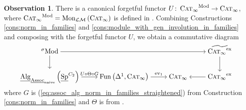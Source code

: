 \documentclass{article}
\DeclareMathOperator{\Alg}{Alg}
\DeclareMathOperator{\Cat}{Cat} %
\DeclareMathOperator{\CAT}{C\normalfont\textsc{at}_\infty} %
\DeclareMathOperator{\Catex}{\Cat_\infty^{ex}} %
\DeclareMathOperator{\Fun}{Fun} %
\DeclareMathOperator{\Mod}{Mod} %
\DeclareMathOperator{\Modh}{{}^{\sigma}Mod} %
\DeclareMathOperator{\Spectra}{Sp} %
\newcommand{\ev}{\mathrm{ev}}
\theoremstyle{definition}
\newtheorem{observation}[equation]{Observation}
\begin{document}
\begin{observation}   
    There is a canonical forgetful functor $ U \colon \CAT^{\Mod} \to \CAT $, where $ \CAT^{\Mod} = \mathrm{Mon}_{\mathcal{LM}}\left(\CAT\right) $ is defined in \cite[immediately preceding Remark 4.8.3.20]{LurHA}. %
    Combining Constructions \ref{cons:norm_in_families} and \ref{cons:module_with_gen_involution_in_families} and composing with the forgetful functor $ U $, we obtain a commutative diagram
    \begin{equation}\label{diagram:calgp_to_functor_cat_with_pointed_target}
    \begin{tikzcd}[cramped]
        \Modh \ar[rrr] \ar[d] & & & \widetilde{\CAT^{\mathrm{ex}}} \ar[d] \\ 
        \underline{\Alg}_{\underline{\mathrm{Assoc}}_{\mathrm{naive}}}\left(\underline{\Spectra}^{C_2}\right) \ar[r,"{U \circ \Theta \circ G}"] & \Fun\left(\Delta^1, \CAT \right) \ar[r,"{\ev_1}"] & \CAT & \CAT^{\mathrm{ex}} \ar[l] 
    \end{tikzcd}
    \end{equation}
    where $ G $ is (\ref{eq:assoc_alg_norm_in_families_straightened}) from Construction \ref{cons:norm_in_families} and $ \Theta $ is from \cite[Construction 4.8.3.24]{LurHA}. 


\end{observation}
\end{document}
